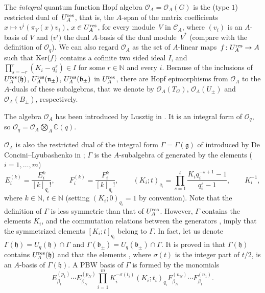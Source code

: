 \documentclass[pdftex]{sigma}
\numberwithin{equation}{section}
\theoremstyle{definition}
\newcommand{\mc}{\mathbb{C}}
\newcommand{\mn}{\mathbb{N}}
\newcommand{\Oo}{{\mathcal O}}
\newcommand{\ra}{\rightarrow}
\begin{document}
The {\it integral} quantum function Hopf algebra $\Oo_A=\Oo_A(G)$ is the (type $1$) restricted dual of~$U_A^{\rm res}$, that is, the $A$-span of the matrix coefficients $x\mapsto v^i(\pi_V(x)v_i)$, $x\in U_A^{\rm res}$, for every module~$V$ in $\mathcal{C}_A$, where $(v_i)$ is an $A$-basis of $V$ and $\big(v^i\big)$ the dual $A$-basis of the dual module~$V^*$ (compare with the definition of $\Oo_q$). We can also regard $\Oo_A$ as the set of $A$-linear maps~${f\colon U_A^{\rm res}\ra A}$ such that ${\rm Ker}(f)$ contains a cofinite two sided ideal $I$, and $ \prod_{s=-r}^r (K_i - q_i^s) \in I$ for some $r\in \mathbb{N}$ and every $i$. Because of the inclusions of $U_A^{\rm res}(\mathfrak{h})$, $U_A^{\rm res}(\mathfrak{n}_\pm)$, $U_A^{\rm res}(\mathfrak{b}_\pm)$ in $U_A^{\rm res}$, there are Hopf epimorphisms from $\Oo_A$ to the $A$-duals of these subalgebras, that we denote by $\Oo_A(T_G)$, $\Oo_A(U_\pm)$ and $\Oo_A(B_\pm)$, respectively.

The algebra $\Oo_A$ has been introduced by Lusztig in \cite{Lusztig2,Lusztig}. It is an integral form of $\Oo_q$, so $\Oo_q = \Oo_A \bigotimes_A \mc(q)$.

$\Oo_A$ is also the restricted dual of the integral form $\Gamma=\Gamma(\mathfrak{g})$ of  introduced by De Concini--Lyubashenko in \cite[Sections 2 and~3]{DC-L}; $\Gamma$ is the $A$-subalgebra of  generated by the elements ($i=1,\dots,m$)
\[E_i^{(k)}= \frac{E_i^k}{[k]_{q_i}!} ,\qquad F_i^{(k)}= \frac{F_i^k}{[k]_{q_i}!} ,\qquad ( K_i; t )_{q_i}= \prod_{s=1}^t \frac{K_iq_i^{-s+1}-1}{q_i^s-1},\qquad K_i^{-1},\]
where $k\in \mn$, $t\in \mn$ (setting $( K_i; 0)_{q_i}=1$ by convention). Note that the definition of $\Gamma$ is less symmetric than that of $U_A^{\rm res}$. However, $\Gamma$ contains the elements $K_i$, and the commutation relations between the generators ,  imply that the symmetrized elements $[ K_i; t ]_{q_i}$ belong to $\Gamma$. In fact, let us denote $\Gamma(\mathfrak{h}) = U_q(\mathfrak{h}) \cap \Gamma$ and $\Gamma(\mathfrak{b}_\pm) = U_q(\mathfrak{b}_\pm) \cap \Gamma$. It is proved in \cite[Theorem 3.1]{DC-L} that $\Gamma(\mathfrak{h})$ contains $U_A^{\rm res}(\mathfrak{h})$ and that the elements \smash{$ \prod_{i=1}^m K_i^{-\sigma(t_i)}(K_i; t_i)_{q_i}$, $t_i\in \mn$}, where $\sigma(t)$ is the integer part of $t/2$, is an $A$-basis of $\Gamma(\mathfrak{h})$. A PBW basis of $\Gamma$ is formed by the monomials
\[%
E_{\beta_1}^{(p_1)}\cdots E_{\beta_N}^{(p_N)}\prod_{i=1}^m K_i^{-\sigma(t_i)}(K_i; t_i)_{q_i} F_{\beta_N}^{(n_N)}\cdots F_{\beta_1}^{(n_1)}.
\]
\end{document}
